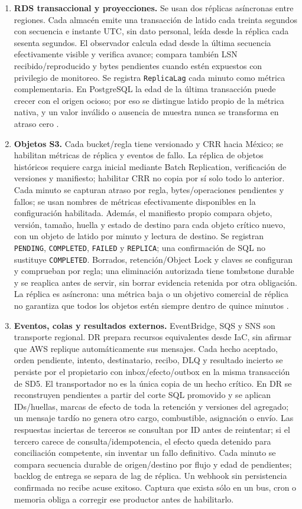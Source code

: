 \begin{enumerate}
\item \textbf{RDS transaccional y proyecciones.} Se usan dos réplicas asíncronas entre regiones. Cada almacén emite una transacción de latido cada treinta segundos con secuencia e instante UTC, sin dato personal, leída desde la réplica cada sesenta segundos. El observador calcula edad desde la última secuencia efectivamente visible y verifica avance; compara también LSN recibido/reproducido y bytes pendientes cuando estén expuestos con privilegio de monitoreo. Se registra \texttt{ReplicaLag} cada minuto como métrica complementaria. En PostgreSQL la edad de la última transacción puede crecer con el origen ocioso; por eso se distingue latido propio de la métrica nativa, y un valor inválido o ausencia de muestra nunca se transforma en atraso cero \parencite{l14-rds-lag}.
\item \textbf{Objetos S3.} Cada bucket/regla tiene versionado y CRR hacia México; se habilitan métricas de réplica y eventos de fallo. La réplica de objetos históricos requiere carga inicial mediante Batch Replication, verificación de versiones y manifiesto; habilitar CRR no copia por sí solo todo lo anterior. Cada minuto se capturan atraso por regla, bytes/operaciones pendientes y fallos; se usan nombres de métricas efectivamente disponibles en la configuración habilitada. Además, el manifiesto propio compara objeto, versión, tamaño, huella y estado de destino para cada objeto crítico nuevo, con un objeto de latido por minuto y lectura de destino. Se registran \texttt{PENDING}, \texttt{COMPLETED}, \texttt{FAILED} y \texttt{REPLICA}; una confirmación de SQL no sustituye \texttt{COMPLETED}. Borrados, retención/Object Lock y claves se configuran y comprueban por regla; una eliminación autorizada tiene tombstone durable y se reaplica antes de servir, sin borrar evidencia retenida por otra obligación. La réplica es asíncrona: una métrica baja o un objetivo comercial de réplica no garantiza que todos los objetos estén siempre dentro de quince minutos \parencite{l14-s3-replica}.
\item \textbf{Eventos, colas y resultados externos.} EventBridge, SQS y SNS son transporte regional. DR prepara recursos equivalentes desde IaC, sin afirmar que AWS replique automáticamente sus mensajes. Cada hecho aceptado, orden pendiente, intento, destinatario, recibo, DLQ y resultado incierto se persiste por el propietario con inbox/efecto/outbox en la misma transacción de SD5. El transportador no es la única copia de un hecho crítico. En DR se reconstruyen pendientes a partir del corte SQL promovido y se aplican IDs/huellas, marcas de efecto de toda la retención y versiones del agregado; un mensaje tardío no genera otro cargo, combustible, asignación o envío. Las respuestas inciertas de terceros se consultan por ID antes de reintentar; si el tercero carece de consulta/idempotencia, el efecto queda detenido para conciliación competente, sin inventar un fallo definitivo. Cada minuto se compara secuencia durable de origen/destino por flujo y edad de pendientes; backlog de entrega se separa de lag de réplica. Un webhook sin persistencia confirmada no recibe acuse exitoso. Captura que exista sólo en un bus, cron o memoria obliga a corregir ese productor antes de habilitarlo.

\end{enumerate}
